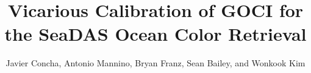 \documentclass[10pt]{article}
\begin{document}
\title{Vicarious Calibration of GOCI for the SeaDAS Ocean Color Retrieval}

\author{Javier Concha, Antonio Mannino, Bryan Franz, Sean Bailey, and Wonkook Kim}

\address{Ocean Ecology Lab,
NASA Goddard Space Flight Center, Greenbelt, MD, USA\\
Universities Space Research Association, Columbia, MD, USA\\
Korea Institute of Ocean Science and Technology, Busan, Republic of Korea}



\end{document}
